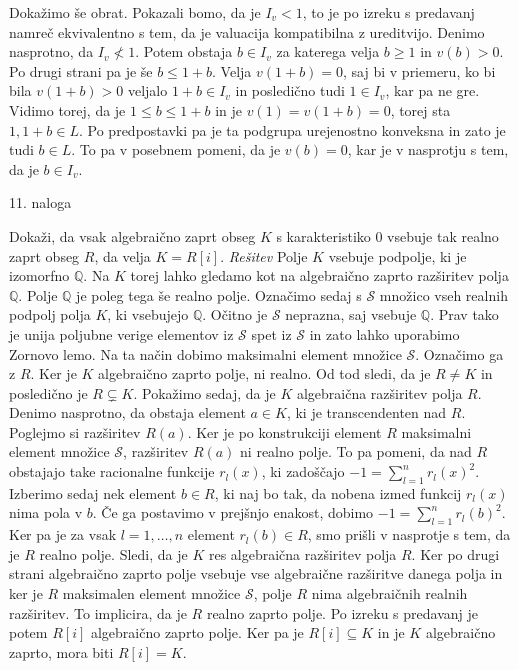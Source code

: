 \documentclass[a4paper, 12pt]{article}
\newcommand{\Q}{\mathbb{Q}}
\begin{document}
\begin{enumerate}
Dokažimo še obrat. Pokazali bomo, da je $I_v < 1$, to je po izreku s predavanj namreč ekvivalentno s tem, da je valuacija kompatibilna z ureditvijo. Denimo nasprotno, da $I_v \not< 1$. Potem obstaja $b\in I_v$ za katerega velja $b \ge 1$ in $v(b) >0$. Po drugi strani pa je  še $b\le 1+b$. Velja $v(1+b) = 0$, saj bi v priemeru, ko bi bila $v(1+b)> 0$ veljalo $1+b\in I_v$ in posledično tudi $1 \in I_v$, kar pa ne gre. Vidimo torej, da je $1\le b \le 1+b$ in je $v(1) = v(1+b) = 0$, torej sta $1, 1+b\in L$. Po predpostavki pa je ta podgrupa urejenostno konveksna in zato je tudi $b\in L$. To pa v posebnem pomeni, da je $v(b)= 0$, kar je v nasprotju s tem, da je $b\in I_v$. 
\end{enumerate}

\begin{flushleft}
11. naloga
\end{flushleft}
Dokaži, da vsak algebraično zaprt obseg $K$ s karakteristiko 0 vsebuje tak realno zaprt obseg $R$, da velja $K = R[i]$.
\newline
\emph{Rešitev}
\newline
Polje $K$ vsebuje podpolje, ki je izomorfno $\Q$. Na $K$ torej lahko gledamo kot na algebraično zaprto razširitev polja $\Q$. Polje $\Q$ je poleg tega še realno polje. Označimo sedaj s $\mathcal{S}$ množico vseh realnih podpolj polja $K$, ki vsebujejo $\Q$. Očitno je $\mathcal{S}$ neprazna, saj vsebuje $\Q$. Prav tako je unija poljubne verige elementov iz $\mathcal{S}$ spet iz $\mathcal{S}$ in zato lahko uporabimo Zornovo lemo. Na ta način dobimo maksimalni element množice $\mathcal{S}$. Označimo ga z $R$. Ker je $K$ algebraično zaprto polje, ni realno. Od tod sledi, da je $R\neq K$ in posledično je $R\subsetneq K$. Pokažimo sedaj, da je $K$ algebraična razširitev polja $R$. Denimo nasprotno, da obstaja element $a\in K$, ki je transcendenten nad $R$. Poglejmo si razširitev $R(a)$. Ker je po konstrukciji element $R$ maksimalni element množice $\mathcal{S}$, razširitev $R(a)$ ni realno polje. To pa pomeni, da nad $R$ obstajajo take racionalne funkcije $r_l(x)$, ki zadoščajo $-1 = \sum_{l=1} ^n  r_l(x)^2$. Izberimo sedaj nek element $b\in R$, ki naj bo tak, da nobena izmed funkcij $r_l(x)$ nima pola v $b$. Če ga postavimo v prejšnjo enakost, dobimo $-1 = \sum_{l=1}^n r_l(b)^2$. Ker pa je za vsak $l=1,\dots,n$ element $r_l(b) \in R$, smo prišli v nasprotje s tem, da je $R$ realno polje. Sledi, da je $K$ res algebraična razširitev polja $R$. Ker po drugi strani algebraično zaprto polje vsebuje vse algebraične razširitve danega polja in ker je $R$ maksimalen element množice $\mathcal{S}$, polje $R$ nima algebraičnih realnih razširitev. To implicira, da je $R$ realno zaprto polje. Po izreku s predavanj je potem $R[i]$ algebraično zaprto polje. Ker pa je $R[i]\subseteq K$ in je $K$ algebraično zaprto, mora biti $R[i] = K$.
\end{document}
